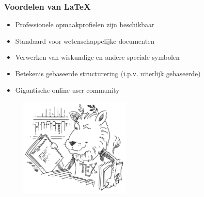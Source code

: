 \documentclass{beamer}
\begin{document}

\begin{frame}
\frametitle{Voordelen van \LaTeX}
\begin{itemize}
 \item Professionele opmaakprofielen zijn beschikbaar
 \item Standaard voor wetenschappelijke documenten
 \item Verwerken van wiskundige en andere speciale symbolen
 \item Betekenis gebaseerde structurering (i.p.v. uiterlijk gebaseerde)
 \item Gigantische online user community
\end{itemize}
\begin{figure}[hb] 
  \includegraphics[width=0.5\textwidth]{images/lion.png}
\end{figure}

\end{frame}

\end{document}
